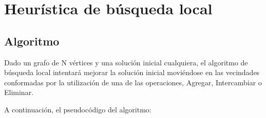\documentclass[a4paper, 10pt, twoside]{article}
\begin{document}


\newpage

\section{Heurística de búsqueda local}
\subsection{Algoritmo}
Dado un grafo de N vértices y una solución inicial cualquiera, el algoritmo de búsqueda local intentará mejorar la solución inicial moviéndose en las vecindades conformadas por la utilización de una de las operaciones, Agregar, Intercambiar o Eliminar.

A continuación, el pseudocódigo del algoritmo:
\end{document}
